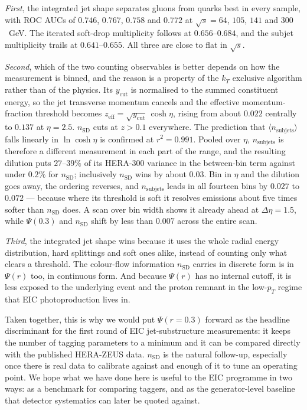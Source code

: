 \documentclass[reprint,amsmath,amssymb,aps,prd,floatfix]{revtex4-2}
\begin{document}
\textit{First}, the integrated jet shape separates gluons from quarks best in
every sample, with ROC AUCs of $0.746$, $0.767$, $0.758$ and $0.772$ at
$\sqrt{s} = 64$, $105$, $141$ and $300$~GeV. The iterated soft-drop multiplicity
follows at $0.656$--$0.684$, and the subjet multiplicity trails at
$0.641$--$0.655$. All three are close to flat in $\sqrt{s}$.

\textit{Second}, which of the two counting observables is better depends on how
the measurement is binned, and the reason is a property of the $k_T$ exclusive
algorithm rather than of the physics. Its $y_{\mathrm{cut}}$ is normalised to
the summed constituent energy, so the jet transverse momentum cancels and the
effective momentum-fraction threshold becomes
$z_{\mathrm{eff}} = \sqrt{y_{\mathrm{cut}}}\,\cosh\eta$, rising from about
$0.022$ centrally to $0.137$ at $\eta = 2.5$. $n_{\mathrm{SD}}$ cuts at
$z > 0.1$ everywhere. The prediction that
$\langle n_{\mathrm{subjets}}\rangle$ falls linearly in $\ln\cosh\eta$ is
confirmed at $r^2 = 0.991$. Pooled over $\eta$, $n_{\mathrm{subjets}}$ is
therefore a different measurement in each part of the range, and the resulting
dilution puts $27$--$39\%$ of its HERA-300 variance in the between-bin term
against under $0.2\%$ for $n_{\mathrm{SD}}$; inclusively $n_{\mathrm{SD}}$ wins
by about $0.03$. Bin in $\eta$ and the dilution goes away, the ordering reverses,
and $n_{\mathrm{subjets}}$ leads in all fourteen bins by $0.027$ to $0.072$ ---
because where its threshold is soft it resolves emissions about five times
softer than $n_{\mathrm{SD}}$ does. A scan over bin width shows it already
ahead at $\Delta\eta = 1.5$, while $\Psi(0.3)$ and $n_{\mathrm{SD}}$ shift by
less than $0.007$ across the entire scan.

\textit{Third}, the integrated jet shape wins because it uses the whole radial
energy distribution, hard splittings and soft ones alike, instead of counting
only what clears a threshold. The colour-flow information $n_{\mathrm{SD}}$
carries in discrete form is in $\Psi(r)$ too, in continuous form. And because
$\Psi(r)$ has no internal cutoff, it is less exposed to the underlying event and
the proton remnant in the low-$p_T$ regime that EIC photoproduction lives in.

Taken together, this is why we would put $\Psi(r=0.3)$ forward as the headline
discriminant for the first round of EIC jet-substructure measurements: it keeps
the number of tagging parameters to a minimum and it can be compared directly
with the published HERA-ZEUS data. $n_{\mathrm{SD}}$ is the natural follow-up,
especially once there is real data to calibrate against and enough of it to tune
an operating point. We hope what we have done here is useful to the EIC
programme in two ways: as a benchmark for comparing taggers, and as the
generator-level baseline that detector systematics can later be quoted against.
\end{document}
